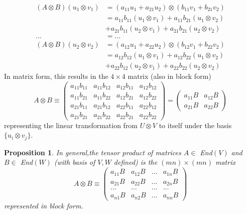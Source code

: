 \documentclass{article}
\newtheorem{proposition}[theorem]{Proposition}
\theoremstyle{remark}
\theoremstyle{definition}
\begin{document}
    \begin{align*}
        (A \otimes B) (u_1 \otimes v_1) &= (a_{11} u_1 + a_{21} u_2) \otimes (b_{11} v_1 + b_{21} v_2) \\
        & = a_{11} b_{11} (u_1 \otimes v_1) + a_{11} b_{21} (u_1 \otimes v_2) \\
        & + a_{21} b_{11} (u_2 \otimes v_1) + a_{21} b_{21} (u_2 \otimes v_2) \\
        ... & = ... \\
        (A \otimes B) (u_2 \otimes v_2) & = (a_{12} u_1 + a_{22} u_2) \otimes (b_{12} v_1 + b_{22} v_2) \\
        & = a_{12} b_{12} (u_1 \otimes v_1) + a_{12} b_{22} (u_1 \otimes v_2) \\
        & + a_{22} b_{12} (u_2 \otimes v_1) + a_{22} b_{22} (u_2 \otimes v_2) 
    \end{align*}
    In matrix form, this results in the $4\times 4$ matrix (also in block form)
    \[A \otimes B \equiv \begin{pmatrix}
    a_{11} b_{11} & a_{11} b_{12} & a_{12} b_{11} & a_{12} b_{12} \\
    a_{11} b_{21} & a_{11} b_{22} & a_{12} b_{21} & a_{12} b_{22} \\
    a_{21} b_{11} & a_{21} b_{12} & a_{22} b_{11} & a_{22} b_{12} \\
    a_{21} b_{21} & a_{21} b_{22} & a_{22} b_{21} & a_{22} b_{22} 
    \end{pmatrix} = \begin{pmatrix}
    a_{11} B & a_{12} B \\
    a_{21} B & a_{22} B 
    \end{pmatrix}\]
    representing the linear transformation from $U \otimes V$ to itself under the basis $\{u_i \otimes v_j\}$. 
    \begin{proposition}
    In general,the tensor product of matrices $A \in $ End$(V)$ and $B \in $ End$(W)$ (with basis of $V, W$ defined) is the $(m n) \times (m n)$ matrix
    \[A \otimes B \equiv \begin{pmatrix}
    a_{11} B & a_{12} B & ... & a_{1n} B \\
    a_{21} B & a_{22} B & ... & a_{2n} B \\
    ... & ... & ... & ... \\
    a_{n1} B & a_{n2} B & ... & a_{nn} B 
    \end{pmatrix}\]
    represented in block form. 
    \end{proposition}
\end{document}
